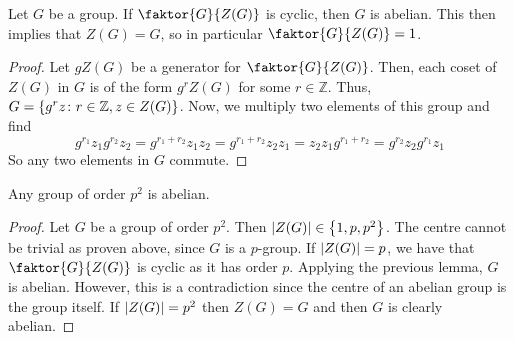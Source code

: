 \begin{lemma}
	Let \( G \) be a group.
	If \( \faktor{G}{Z(G)} \) is cyclic, then \( G \) is abelian.
	This then implies that \( Z(G) = G \), so in particular \( \faktor{G}{Z(G)} = 1 \).
\end{lemma}
\begin{proof}
	Let \( g Z(G) \) be a generator for \( \faktor{G}{Z(G)} \).
	Then, each coset of \( Z(G) \) in \( G \) is of the form \( g^r Z(G) \) for some \( r \in \mathbb Z \).
	Thus, \( G = \qty{g^r z \colon r \in \mathbb Z, z \in Z(G)} \).
	Now, we multiply two elements of this group and find
	\[
		g^{r_1} z_1 g^{r_2} z_2 = g^{r_1 + r_2} z_1 z_2 = g^{r_1 + r_2} z_2 z_1 = z_2 z_1 g^{r_1 + r_2} = g^{r_2} z_2 g^{r_1} z_1
	\]
	So any two elements in \( G \) commute.
\end{proof}
\begin{corollary}
	Any group of order \( p^2 \) is abelian.
\end{corollary}
\begin{proof}
	Let \( G \) be a group of order \( p^2 \).
	Then \( \abs{Z(G)} \in \qty{1, p, p^2} \).
	The centre cannot be trivial as proven above, since \( G \) is a \( p \)-group.
	If \( \abs{Z(G)} = p \), we have that \( \faktor{G}{Z(G)} \) is cyclic as it has order \( p \).
	Applying the previous lemma, \( G \) is abelian.
	However, this is a contradiction since the centre of an abelian group is the group itself.
	If \( \abs{Z(G)} = p^2 \) then \( Z(G) = G \) and then \( G \) is clearly abelian.
\end{proof}

